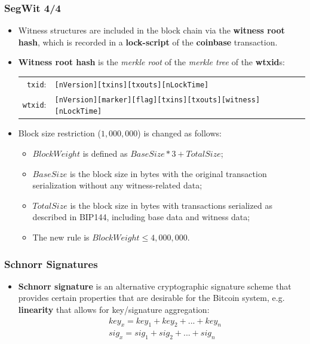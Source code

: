 \documentclass{beamer}
\begin{document}
\begin{frame}
  \frametitle{SegWit 4/4}
  \begin{itemize}
  \item Witness structures are included in the block chain via the
    \textbf{witness root hash}, which is recorded in a \textbf{lock-script} of
    the \textbf{coinbase} transaction.
  \item \textbf{Witness root hash} is the \textit{merkle root} of the
    \textit{merkle tree} of the \textbf{wtxid}s: \break
    \begin{tabular}{rl}
      \texttt{txid}: &\tiny\texttt{[nVersion][txins][txouts][nLockTime]} \\
      \texttt{wtxid}: &\tiny\texttt{[nVersion][marker][flag][txins][txouts][witness][nLockTime]} \\
    \end{tabular}
  \item Block size restriction ($1,000,000$) is changed as follows:
    \begin{itemize}
    \item $BlockWeight$ is defined as $BaseSize * 3 + TotalSize$;
    \item $BaseSize$ is the block size in bytes with the original transaction
      serialization without any witness-related data;
    \item $TotalSize$ is the block size in bytes with transactions serialized as
      described in BIP144, including base data and witness data;
    \item The new rule is $BlockWeight \leq 4,000,000$.
    \end{itemize}
  \end{itemize}
\end{frame}

\begin{frame}
  \frametitle{Schnorr Signatures}
  \begin{itemize}
  \item \textbf{Schnorr signature} is an alternative cryptographic signature
    scheme that provides certain properties that are desirable for the Bitcoin
    system, e.g. \textbf{linearity} that allows for key/signature aggregation:
    \begin{align*}
      &key_x = key_1 + key_2 + ... + key_n \\
      &sig_x = sig_1 + sig_2 + ... + sig_n \\
    \end{align*}
  \end{itemize}
\end{frame}
\end{document}
